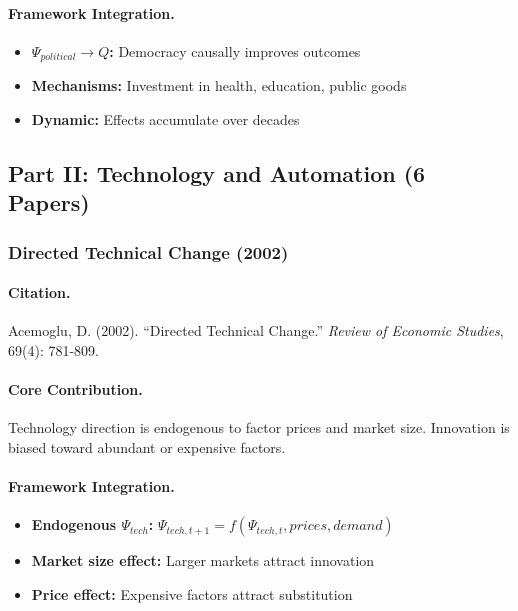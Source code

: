 \paragraph{Framework Integration.}
\begin{itemize}
  \item \textbf{$\Psi_{political} \to Q$:} Democracy causally improves outcomes
  \item \textbf{Mechanisms:} Investment in health, education, public goods
  \item \textbf{Dynamic:} Effects accumulate over decades
\end{itemize}

\subsection{Part II: Technology and Automation (6 Papers)}

\subsubsection{Directed Technical Change (2002)}

\paragraph{Citation.}
Acemoglu, D. (2002). ``Directed Technical Change.''
\emph{Review of Economic Studies}, 69(4): 781-809.

\paragraph{Core Contribution.}
Technology direction is endogenous to factor prices and market size.
Innovation is biased toward abundant or expensive factors.

\paragraph{Framework Integration.}
\begin{itemize}
  \item \textbf{Endogenous $\Psi_{tech}$:} $\Psi_{tech,t+1} = f(\Psi_{tech,t}, prices, demand)$
  \item \textbf{Market size effect:} Larger markets attract innovation
  \item \textbf{Price effect:} Expensive factors attract substitution
\end{itemize}

